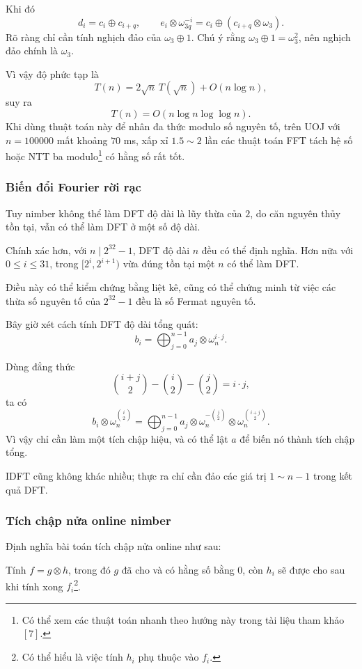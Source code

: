 \documentclass[11pt]{article}
\begin{document}
Khi đó
\[
  d_i=c_i\oplus c_{i+q},\qquad
  e_i\otimes \omega_{3q}^{-i}=c_i\oplus(c_{i+q}\otimes\omega_3).
\]
Rõ ràng chỉ cần tính nghịch đảo của \(\omega_3\oplus 1\). Chú ý rằng
\(\omega_3\oplus 1=\omega_3^2\), nên nghịch đảo chính là \(\omega_3\).

Vì vậy độ phức tạp là
\[
  T(n)=2\sqrt n\,T(\sqrt n)+O(n\log n),
\]
suy ra
\[
  T(n)=O(n\log n\log\log n).
\]
Khi dùng thuật toán này để nhân đa thức modulo số nguyên tố, trên UOJ với
\(n=100000\) mất khoảng \(70\) ms, xấp xỉ \(1.5\sim 2\) lần các thuật toán FFT
tách hệ số hoặc NTT ba modulo\footnote{Có thể xem các thuật toán nhanh theo
hướng này trong tài liệu tham khảo \([7]\).} có hằng số rất tốt.

\subsubsection{Biến đổi Fourier rời rạc}

Tuy nimber không thể làm DFT độ dài là lũy thừa của \(2\), do căn nguyên thủy
tồn tại, vẫn có thể làm DFT ở một số độ dài.

Chính xác hơn, với \(n\mid 2^{32}-1\), DFT độ dài \(n\) đều có thể định nghĩa.
Hơn nữa với \(0\le i\le 31\), trong \([2^i,2^{i+1})\) vừa đúng tồn tại một \(n\)
có thể làm DFT.

Điều này có thể kiểm chứng bằng liệt kê, cũng có thể chứng minh từ việc các
thừa số nguyên tố của \(2^{32}-1\) đều là số Fermat nguyên tố.

Bây giờ xét cách tính DFT độ dài tổng quát:
\[
  b_i=\bigoplus_{j=0}^{n-1} a_j\otimes \omega_n^{i\cdot j}.
\]

Dùng đẳng thức
\[
  \binom{i+j}{2}-\binom i2-\binom j2=i\cdot j,
\]
ta có
\[
  b_i\otimes\omega_n^{\binom i2}
  =
  \bigoplus_{j=0}^{n-1}
  a_j\otimes\omega_n^{-\binom j2}\otimes\omega_n^{\binom{i+j}{2}}.
\]
Vì vậy chỉ cần làm một tích chập hiệu, và có thể lật \(a\) để biến nó thành
tích chập tổng.

IDFT cũng không khác nhiều; thực ra chỉ cần đảo các giá trị \(1\sim n-1\) trong
kết quả DFT.

\subsubsection{Tích chập nửa online nimber}

Định nghĩa bài toán tích chập nửa online như sau:

Tính \(f=g\otimes h\), trong đó \(g\) đã cho và có hằng số bằng \(0\), còn
\(h_i\) sẽ được cho sau khi tính xong \(f_i\)\footnote{Có thể hiểu là việc tính
\(h_i\) phụ thuộc vào \(f_i\).}.
\end{document}
